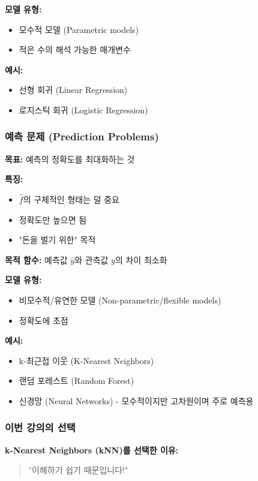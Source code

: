 \documentclass[12pt,a4paper]{article}
\begin{document}
\textbf{모델 유형:}
\begin{itemize}
    \item 모수적 모델 (Parametric models)
    \item 적은 수의 해석 가능한 매개변수
\end{itemize}

\textbf{예시:}
\begin{itemize}
    \item 선형 회귀 (Linear Regression)
    \item 로지스틱 회귀 (Logistic Regression)
\end{itemize}

\subsubsection{예측 문제 (Prediction Problems)}

\textbf{목표:} 예측의 정확도를 최대화하는 것

\textbf{특징:}
\begin{itemize}
    \item $\hat{f}$의 구체적인 형태는 덜 중요
    \item 정확도만 높으면 됨
    \item "돈을 벌기 위한" 목적
\end{itemize}

\textbf{목적 함수:} 예측값 $\hat{y}$와 관측값 $y$의 차이 최소화

\textbf{모델 유형:}
\begin{itemize}
    \item 비모수적/유연한 모델 (Non-parametric/flexible models)
    \item 정확도에 초점
\end{itemize}

\textbf{예시:}
\begin{itemize}
    \item k-최근접 이웃 (K-Nearest Neighbors)
    \item 랜덤 포레스트 (Random Forest)
    \item 신경망 (Neural Networks) - 모수적이지만 고차원이며 주로 예측용
\end{itemize}

\subsubsection{이번 강의의 선택}

\textbf{k-Nearest Neighbors (kNN)를 선택한 이유:}
\begin{quote}
"이해하기 쉽기 때문입니다!"
\end{quote}
\end{document}
